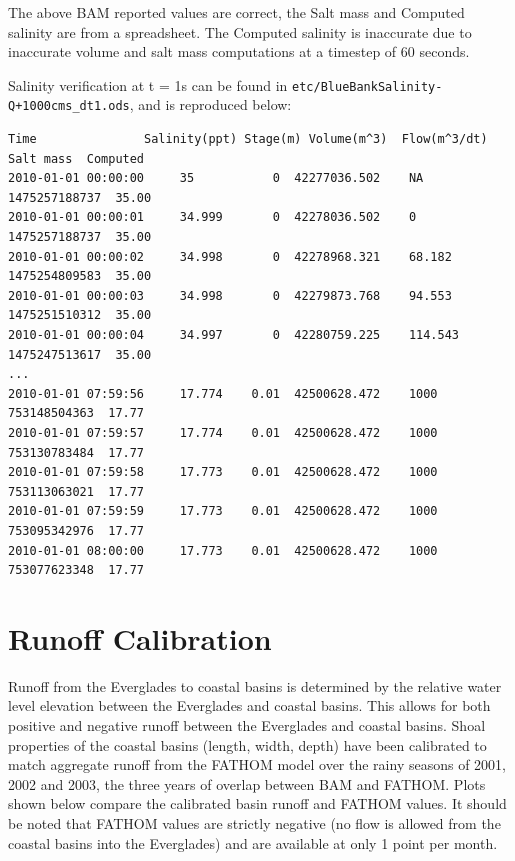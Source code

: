The above BAM reported values are correct, the Salt mass and Computed salinity are from a spreadsheet. The Computed salinity is inaccurate due to inaccurate volume and salt mass computations at a timestep of 60 seconds.  

Salinity verification at t = 1s can be found in \texttt{etc/BlueBankSalinity-Q+1000cms\_dt1.ods}, and is reproduced below:

\small
\begin{verbatim}
Time               Salinity(ppt) Stage(m) Volume(m^3)  Flow(m^3/dt)  Salt mass  Computed
2010-01-01 00:00:00     35           0  42277036.502    NA       1475257188737  35.00
2010-01-01 00:00:01     34.999       0  42278036.502    0        1475257188737  35.00
2010-01-01 00:00:02     34.998       0  42278968.321    68.182   1475254809583  35.00
2010-01-01 00:00:03     34.998       0  42279873.768    94.553   1475251510312  35.00
2010-01-01 00:00:04     34.997       0  42280759.225    114.543  1475247513617  35.00
...
2010-01-01 07:59:56     17.774    0.01  42500628.472    1000      753148504363  17.77
2010-01-01 07:59:57     17.774    0.01  42500628.472    1000      753130783484  17.77
2010-01-01 07:59:58     17.773    0.01  42500628.472    1000      753113063021  17.77
2010-01-01 07:59:59     17.773    0.01  42500628.472    1000      753095342976  17.77
2010-01-01 08:00:00     17.773    0.01  42500628.472    1000      753077623348  17.77
\end{verbatim}
\large

\clearpage 
\section{Runoff Calibration}
\label{sec:Runoff Calibration}
Runoff from the Everglades to coastal basins is determined by the relative water level elevation between the Everglades and coastal basins.  This allows for both positive and negative runoff between the Everglades and coastal basins.  Shoal properties of the coastal basins (length, width, depth) have been calibrated to match aggregate runoff from the FATHOM model \citep{Cosby2010} over the rainy seasons of 2001, 2002 and 2003, the three years of overlap between BAM and FATHOM.  Plots shown below compare the calibrated basin runoff and FATHOM values. It should be noted that FATHOM values are strictly negative (no flow is allowed from the coastal basins into the Everglades) and are available at only 1 point per month. \\[-1cm]

